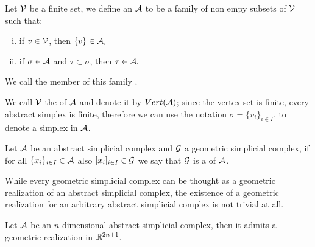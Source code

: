 \documentclass[../1.tex]{subfiles}
\begin{document}
    \begin{defn}
        Let $\mathcal{V}$ be a finite set, we define an  $\mathcal{A}$ to be 
        a family of non empy subsets of $\mathcal{V}$ such that:
        \begin{enumerate}[(i)]
            \item if $v \in \mathcal{V}$, then $\{v\} \in \mathcal{A},$
            \item if $\sigma \in \mathcal{A}$ and $\tau \subset \sigma$, then $\tau \in \mathcal{A}.$
        \end{enumerate}
        We call the member of this family .
    \end{defn}
    
    We call $\mathcal{V}$ the  of $\mathcal{A}$ and denote it by $Vert(\mathcal{A})$; since the vertex
    set is finite, every abstract simplex is finite, therefore we can use the notation $\sigma = \{ v_i \}_{i \in I}$, to denote a simplex in $\mathcal{A}$.
    
    \begin{defn}
        Let $\mathcal{A}$ be an abstract simplicial complex and $\mathcal{G}$ a geometric simplicial complex, if for all $\{x_i\}_{i \in I} \in \mathcal{A}$ also $[x_i]_{i \in I} \in \mathcal{G}$
        we say that $\mathcal{G}$ is a  of $\mathcal{A}$.
    \end{defn}

    While every geometric simplicial complex can be thought as a geometric realization of an abstract simplicial complex, the existence of a geometric 
    realization for an arbitrary abstract simplicial complex is not trivial at all.

    \begin{thm}
        \label{thm:2}
        Let $\mathcal{A}$ be an $n$-dimensional abstract simplicial complex, then it admits a geometric realization in $\mathbb{R}^{2n+1}$.
    \end{thm}
\end{document}
